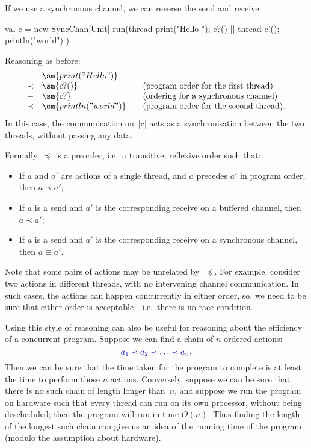 If we use a synchronous channel, we can reverse the send and receive:
%
\begin{scala}
  val c = new SyncChan[Unit]
  run(thread{ print("Hello "); c?() } || thread{ c!(); println("world") })
\end{scala}
%
Reasoning as before:
\[
\begin{array}{cl@{\qquad}l}
& \sm{print("Hello ")} \\
\prec & \sm{c?()} & \mbox{(program order for the first thread)} \\
\equiv & \sm{c?{}} & \mbox{(ordering for a synchronous channel)} \\
\prec & \sm{println("world")} & \mbox{(program order for the second thread).}
\end{array}
\]
In this case, the communication on~|c| acts as a synchronisation between the
two threads, without passing any data.
  
Formally, $\preceq$ is a preorder, i.e.~a transitive, reflexive order such
that:
%
\begin{itemize}
\item
If $a$ and $a'$ are actions of a single thread, and $a$ precedes $a'$ in
program order, then $a \prec a'$;

\item
If $a$ is a send and $a'$ is the corresponding receive on a buffered channel,
then $a \prec a'$;

\item
If $a$ is a send and $a'$ is the corresponding receive on a synchronous
channel, then $a \equiv a'$.
\end{itemize}

Note that some pairs of actions may be unrelated by~$\preceq$.  For example,
consider two actions in different threads, with no intervening channel
communication.  In such cases, the actions can happen concurrently in either
order, so, we need to be sure that either order is acceptable---i.e.~there is
no race condition.

Using this style of reasoning can also be useful for reasoning about the
efficiency of a concurrent program.  Suppose we can find a chain of $n$
ordered actions:
\[
\mstyle
a_1 \prec a_2 \prec \ldots \prec a_n. 
\]
Then we can be sure that the time taken for the program to complete is at
least the time to perform those $n$ actions.  Conversely, suppose we can be
sure that there is no such chain of length longer than~$n$, and suppose we run
the program on hardware such that every thread can run on its own processor,
without being descheduled; then the program will run in time $O(n)$.  Thus
finding the length of the longest such chain can give us an idea of the
running time of the program (modulo the assumption about hardware).


